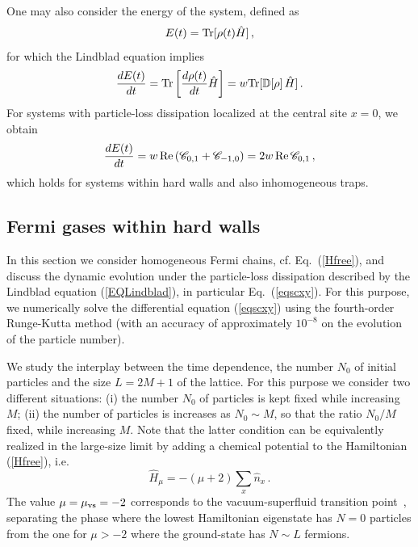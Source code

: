   One may also consider the energy of the system, defined as
  \begin{eqnarray}
  E(t) = {\rm Tr}[\rho(t) \hat H] \,,
  \label{enedef}
  \end{eqnarray}
  for which the Lindblad equation implies
  \begin{eqnarray}
    {d E(t)\over dt} = {\rm Tr}\left[{d\rho(t)\over dt} \hat H\right]= w
    {\rm Tr}[{\mathbb D}[\rho] \,\hat H]\,.
    \label{detg}
  \end{eqnarray}
  For systems with particle-loss dissipation localized at the central
  site $x=0$, we obtain
  \begin{eqnarray}
    {d E(t)\over dt} =
    w \, {\rm Re}\,({\mathscr C}_{0,1}+{\mathscr C}_{-1,0}) =
    2 w \, {\rm Re}\,{\mathscr C}_{0,1}\,,
    \label{derene}
  \end{eqnarray}
  which holds for systems within hard walls and also inhomogeneous
  traps.
  
  \subsection{Fermi gases within hard walls}
  \label{hwbc}
  
  In this section we consider homogeneous Fermi chains, cf.
  Eq.~(\ref{Hfree}), and discuss the dynamic evolution under the
  particle-loss dissipation described by the Lindblad equation
  (\ref{EQLindblad}), in particular Eq.~(\ref{eqscxy}). For this
  purpose, we numerically solve the differential equation (\ref{eqscxy})
  using the fourth-order Runge-Kutta method (with an accuracy of
  approximately $10^{-8}$ on the evolution of the particle number).
  
  We study the interplay between the time dependence, the number $N_0$
  of initial particles and the size $L=2M+1$ of the lattice.  For this
  purpose we consider two different situations: (i) the number $N_0$ of
  particles is kept fixed while increasing $M$; (ii) the number of
  particles is increases as $N_0\sim M$, so that the ratio $N_0/M$
  fixed, while increasing $M$. Note that the latter condition can be
  equivalently realized in the large-size limit by adding a chemical
  potential to the Hamiltonian (\ref{Hfree}), i.e.
  \begin{equation}
  \hat H_\mu = -(\mu+2) \sum _x \hat n_x \,.
  \label{chemicalpot}
  \end{equation}
  The value $\mu=\mu_{\rm vs}=-2$ corresponds to the vacuum-superfluid
  transition point~\cite{Sachdev-book,ACV-14}, separating the phase
  where the lowest Hamiltonian eigenstate has $N=0$ particles from the
  one for $\mu>-2$ where the ground-state has $N\sim L$ fermions.
  
